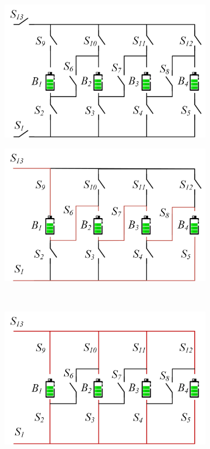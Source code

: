 \documentclass{article}
\begin{document}
\begin{figure}[htbp]
    \centering
    \begin{subfigure}[b]{0.45\textwidth}
        \includegraphics[width=\textwidth]{stru-V-origin}
        \caption{}
        \label{fig:stru-Visairo}
    \end{subfigure}
    \hspace{0.05\textwidth}
    \begin{subfigure}[b]{0.45\textwidth}
        \includegraphics[width=\textwidth]{stru-V-serial}
        \caption{}
        \label{fig:stru-Visairo-serial}
    \end{subfigure}
    \\
    \begin{subfigure}[b]{0.45\textwidth}
        \includegraphics[width=\textwidth]{stru-V-parallel}

\end{subfigure}
\end{figure}
\end{document}
